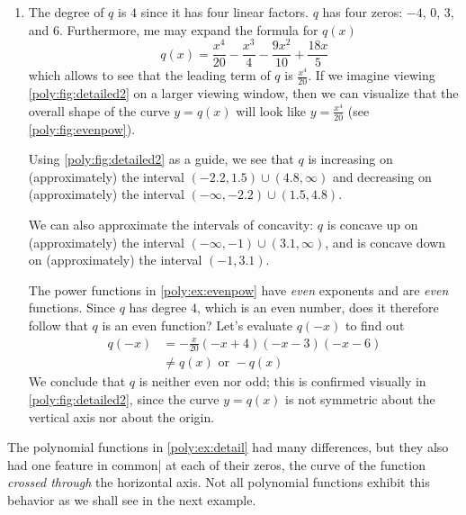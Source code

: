 \begin{pccexample}
\begin{pccsolution}
\begin{enumerate}
\begin{figure}[!htb]
				\label{poly:fig:detailed}
			\end{figure}
			\item The degree of $q$ is $4$ since it has four linear factors. $q$ has 
			four zeros: $-4$, $0$, $3$, and $6$. Furthermore,
			me may expand the formula for $q(x)$
			\[
				q(x)=\frac{x^4}{20}-\frac{x^3}{4}-\frac{9x^2}{10}+\frac{18x}{5}
			\]
			which allows to see that the leading term of $q$ is $\frac{x^4}{20}$. If
			we imagine viewing \cref{poly:fig:detailed2} on a larger viewing 
			window, then we can visualize that the overall shape of the curve $y=q(x)$
			will look like $y=\frac{x^4}{20}$ (see \cref{poly:fig:evenpow}).
				
			Using \cref{poly:fig:detailed2} as a guide, we see that $q$ is increasing
			on (approximately) the interval $(-2.2,1.5)\cup (4.8,\infty)$ and decreasing
			on (approximately) the interval $(-\infty,-2.2)\cup (1.5,4.8)$.
				
			We can also approximate the intervals of concavity: $q$ is concave up on 
			(approximately) the interval $(-\infty,-1)\cup (3.1,\infty)$, and is concave 
			down on (approximately) the interval $(-1,3.1)$.
				
			The power functions in \cref{poly:ex:evenpow} have \emph{even} 
			exponents and are \emph{even} functions. Since $q$ has degree $4$, which 
			is an even number, does it therefore follow that $q$ is an even function?
			Let's evaluate $q(-x)$ to find out
			\begin{align*}
				q(-x) & =-\frac{x}{20}(-x+4)(-x-3)(-x-6) \\ 
				      & \ne q(x) \text{ or } -q(x)       
			\end{align*}
			We conclude that $q$ is neither even nor odd; this is confirmed visually in 
			\cref{poly:fig:detailed2}, since the curve $y=q(x)$ is not symmetric about 
			the vertical axis nor about the origin.
		\end{enumerate}
	\end{pccsolution}
\end{pccexample}

The polynomial functions in \cref{poly:ex:detail} had many differences, 
but they also had one feature in common| at each of their zeros, the 
curve of the function \emph{crossed through} the horizontal axis. Not 
all polynomial functions exhibit this behavior as we shall see in 
the next example.

